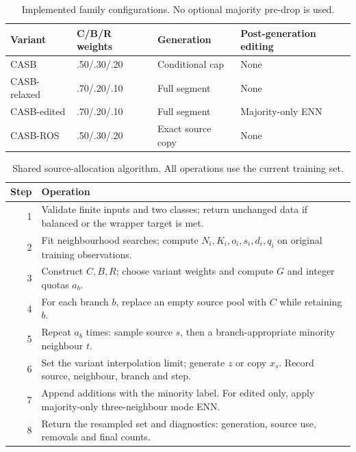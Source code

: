 \documentclass[conference]{IEEEtran}
\begin{document}
\begin{table}[!tbp]\centering\small\caption{Implemented family configurations. No optional majority pre-drop is used.}\label{tab:variants}
\begin{tabular}{llll}\toprule Variant & C/B/R weights & Generation & Post-generation editing\\\midrule
CASB & .50/.30/.20 & Conditional cap & None\\
CASB-relaxed & .70/.20/.10 & Full segment & None\\
CASB-edited & .70/.20/.10 & Full segment & Majority-only ENN\\
CASB-ROS & .50/.30/.20 & Exact source copy & None\\\bottomrule\end{tabular}\end{table}

\begin{table}[!tbp]\centering\small\caption{Shared source-allocation algorithm. All operations use the current training set.}\label{tab:algorithm}
\begin{tabularx}{\linewidth}{rX}\toprule Step & Operation\\\midrule
1 & Validate finite inputs and two classes; return unchanged data if balanced or the wrapper target is met.\\
2 & Fit neighbourhood searches; compute $N_i,K_i,o_i,s_i,d_i,q_i$ on original training observations.\\
3 & Construct $C,B,R$; choose variant weights and compute $G$ and integer quotas $a_b$.\\
4 & For each branch $b$, replace an empty source pool with $C$ while retaining $b$.\\
5 & Repeat $a_b$ times: sample source $s$, then a branch-appropriate minority neighbour $t$.\\
6 & Set the variant interpolation limit; generate $z$ or copy $x_s$. Record source, neighbour, branch and step.\\
7 & Append additions with the minority label. For edited only, apply majority-only three-neighbour mode ENN.\\
8 & Return the resampled set and diagnostics: generation, source use, removals and final counts.\\\bottomrule\end{tabularx}\end{table}
\end{document}
